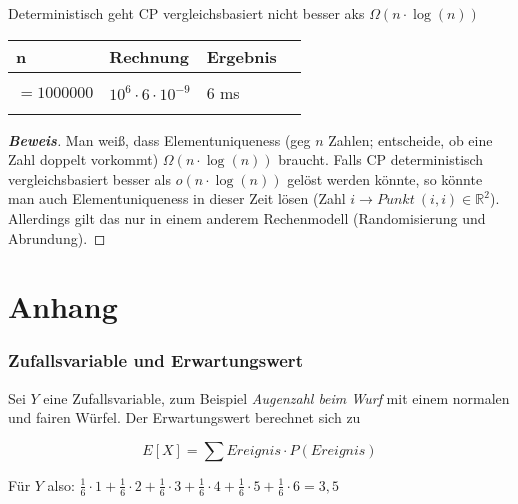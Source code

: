 \documentclass{scrartcl}%
\begin{document}
    Deterministisch geht CP vergleichsbasiert nicht besser aks $\Omega(n \cdot \log(n))$

    \begin{table}[!ht]
        \centering
        \begin{tabular}{llll}
            \textbf{\textsf{n}} & \textbf{\textsf{Rechnung}} & \textbf{\textsf{Ergebnis}}\\
            \hline \\
            $=1000000   $ & $10^6 \cdot 6 \cdot  10^{-9}$   & 6 ms \\
            \hline \\
        \end{tabular}
    \end{table}

    \begin{proof}[\textbf{Beweis}]
        Man weiß, dass Elementuniqueness (geg $n$ Zahlen; entscheide, ob eine Zahl doppelt vorkommt)
        $\Omega(n \cdot \log(n))$ braucht.
        Falls CP deterministisch vergleichsbasiert besser als $o(n \cdot \log(n))$
        gelöst werden könnte, so könnte man auch Elementuniqueness in dieser Zeit lösen
        (Zahl $i \rightarrow Punkt \ (i, i) \in \mathbb{R}^2$). Allerdings gilt das nur in einem
        anderem Rechenmodell (Randomisierung und Abrundung).

    \end{proof}

    \hrulefill

    \section*{Anhang}
    \label{sec:anhang}

    \subsubsection*{Zufallsvariable und Erwartungswert}
    \label{sec:zufallsvariableUndErwartungswert}
    Sei $Y$ eine Zufallsvariable, zum Beispiel \textit{Augenzahl beim Wurf} mit einem normalen und fairen Würfel. \newline
    Der Erwartungswert berechnet sich zu

    \begin{equation*}
        E[X] = \sum Ereignis \cdot P(Ereignis)
    \end{equation*}

    Für $Y$ also: $\frac{1}{6} \cdot 1 + \frac{1}{6} \cdot 2 + \frac{1}{6} \cdot 3 +
    \frac{1}{6} \cdot 4 + \frac{1}{6} \cdot 5 + \frac{1}{6} \cdot 6 = 3,5$
\end{document}
